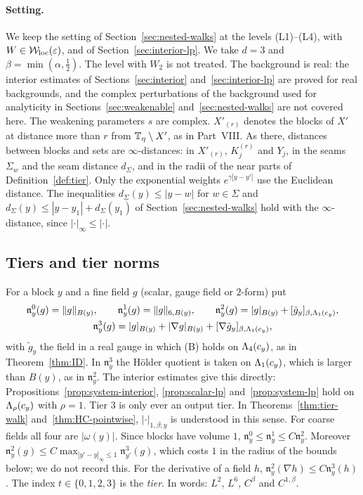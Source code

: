 \paragraph{Setting.} We keep the setting of Section~\ref{sec:nested-walks} at the levels (L1)--(L4), with $W\in\mathcal W_{\rm loc}(\varepsilon)$, and of Section~\ref{sec:interior-lp}. We take $d=3$ and $\beta=\min(\alpha,\frac12)$. The level with $W_2$ is not treated. The background is real: the interior estimates of Sections~\ref{sec:interior} and~\ref{sec:interior-lp} are proved for real backgrounds, and the complex perturbations of the background used for analyticity in Sections~\ref{sec:weakenable} and~\ref{sec:nested-walks} are not covered here. The weakening parameters $s$ are complex. $X'_{(r)}$ denotes the blocks of $X'$ at distance more than $r$ from $\mathbb T_\eta\setminus X'$, as in Part~VIII. As there, distances between blocks and sets are $\infty$-distances: in $X'_{(r)}$, $K_j^{(r)}$ and $Y_j$, in the seams $\Sigma_w$ and the seam distance $d_\Sigma$, and in the radii of the near parts of Definition~\ref{def:tier}. Only the exponential weights $e^{\gamma|y-y'|}$ use the Euclidean distance. The inequalities $d_\Sigma(y)\le|y-w|$ for $w\in\Sigma$ and $d_\Sigma(y)\le|y-y_1|+d_\Sigma(y_1)$ of Section~\ref{sec:nested-walks} hold with the $\infty$-distance, since $|\cdot|_\infty\le|\cdot|$.

\subsection{Tiers and tier norms}

For a block $y$ and a fine field $g$ (scalar, gauge field or $2$-form) put
\[
\begin{gathered}
\mathfrak n^0_y(g)=\|g\|_{B(y)},\qquad\mathfrak n^1_y(g)=\|g\|_{6,B(y)},\qquad\mathfrak n^2_y(g)=|g|_{B(y)}+[\tilde g_y]_{\beta,\Lambda_1(c_y)},\\
\mathfrak n^3_y(g)=|g|_{B(y)}+|\nabla g|_{B(y)}+[\nabla\tilde g_y]_{\beta,\Lambda_1(c_y)},
\end{gathered}
\]
with $\tilde g_y$ the field in a real gauge in which (B) holds on $\Lambda_4(c_y)$, as in Theorem~\ref{thm:ID}. In $\mathfrak n^3_y$ the H\"older quotient is taken on $\Lambda_1(c_y)$, which is larger than $B(y)$, as in $\mathfrak n^2_y$. The interior estimates give this directly: Propositions~\ref{prop:system-interior}, \ref{prop:scalar-lp} and~\ref{prop:system-lp} hold on $\Lambda_\rho(c_y)$ with $\rho=1$. Tier $3$ is only ever an output tier. In Theorems~\ref{thm:tier-walk} and~\ref{thm:HC-pointwise}, $|\cdot|_{1,\beta;y}$ is understood in this sense. For coarse fields all four are $|\omega(y)|$. Since blocks have volume $1$, $\mathfrak n^0_y\le\mathfrak n^1_y\le C\mathfrak n^2_y$. Moreover $\mathfrak n^2_y(g)\le C\max_{|y'-y|_\infty\le1}\mathfrak n^3_{y'}(g)$, which costs $1$ in the radius of the bounds below; we do not record this. For the derivative of a field $h$, $\mathfrak n^2_y(\nabla h)\le C\mathfrak n^3_y(h)$. The index $t\in\{0,1,2,3\}$ is the \emph{tier}. In words: $L^2$, $L^6$, $C^\beta$ and $C^{1,\beta}$.

